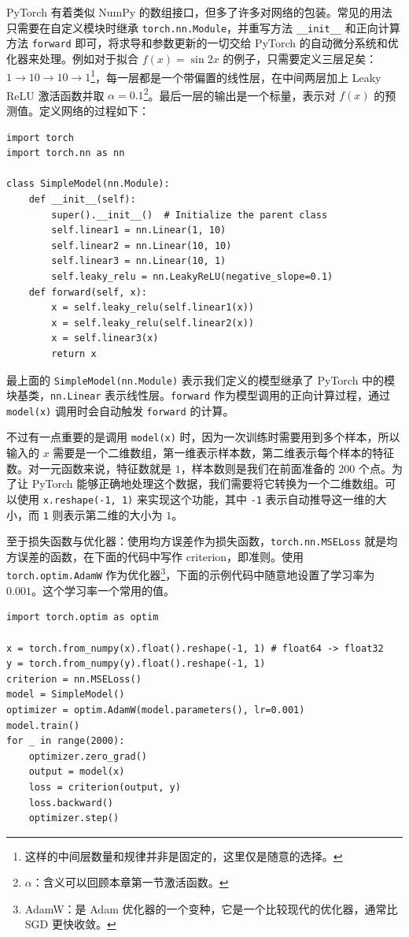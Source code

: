 PyTorch 有着类似 NumPy 的数组接口，但多了许多对网络的包装。常见的用法只需要在自定义模块时继承 \texttt{torch.nn.Module}，并重写方法 \texttt{\_\_init\_\_} 和正向计算方法 \texttt{forward} 即可，将求导和参数更新的一切交给 PyTorch 的自动微分系统和优化器来处理。例如对于拟合 $f(x) = \sin 2x$ 的例子，只需要定义三层足矣：$1\to 10\to 10\to 1$\footnote{这样的中间层数量和规律并非是固定的，这里仅是随意的选择。}，每一层都是一个带偏置的线性层，在中间两层加上 Leaky ReLU 激活函数并取 $\alpha = 0.1$\footnote{$\alpha$：含义可以回顾本章第一节激活函数。}。最后一层的输出是一个标量，表示对 $f(x)$ 的预测值。定义网络的过程如下：
\begin{verbatim}
import torch
import torch.nn as nn

class SimpleModel(nn.Module):
    def __init__(self):
        super().__init__()  # Initialize the parent class
        self.linear1 = nn.Linear(1, 10)
        self.linear2 = nn.Linear(10, 10)
        self.linear3 = nn.Linear(10, 1)
        self.leaky_relu = nn.LeakyReLU(negative_slope=0.1)
    def forward(self, x):
        x = self.leaky_relu(self.linear1(x))
        x = self.leaky_relu(self.linear2(x))
        x = self.linear3(x)
        return x
\end{verbatim}

最上面的 \texttt{SimpleModel(nn.Module)} 表示我们定义的模型继承了 PyTorch 中的模块基类，\texttt{nn.Linear} 表示线性层。\texttt{forward} 作为模型调用的正向计算过程，通过 \texttt{model(x)} 调用时会自动触发 \texttt{forward} 的计算。

不过有一点重要的是调用 \texttt{model(x)} 时，因为一次训练时需要用到多个样本，所以输入的 $x$ 需要是一个二维数组，第一维表示样本数，第二维表示每个样本的特征数。对一元函数来说，特征数就是 $1$，样本数则是我们在前面准备的 $200$ 个点。为了让 PyTorch 能够正确地处理这个数据，我们需要将它转换为一个二维数组。可以使用 \texttt{x.reshape(-1, 1)} 来实现这个功能，其中 \texttt{-1} 表示自动推导这一维的大小，而 \texttt{1} 则表示第二维的大小为 $1$。

至于损失函数与优化器：使用均方误差作为损失函数，\texttt{torch.nn.MSELoss} 就是均方误差的函数，在下面的代码中写作 criterion，即准则。使用 \texttt{torch.optim.AdamW} 作为优化器\footnote{AdamW：是 Adam 优化器的一个变种，它是一个比较现代的优化器，通常比 SGD 更快收敛。}，下面的示例代码中随意地设置了学习率为 $0.001$。这个学习率一个常用的值。
\begin{verbatim}
import torch.optim as optim

x = torch.from_numpy(x).float().reshape(-1, 1) # float64 -> float32
y = torch.from_numpy(y).float().reshape(-1, 1)
criterion = nn.MSELoss()
model = SimpleModel()
optimizer = optim.AdamW(model.parameters(), lr=0.001)
model.train()
for _ in range(2000):
    optimizer.zero_grad()
    output = model(x)
    loss = criterion(output, y)
    loss.backward()
    optimizer.step()
\end{verbatim}

